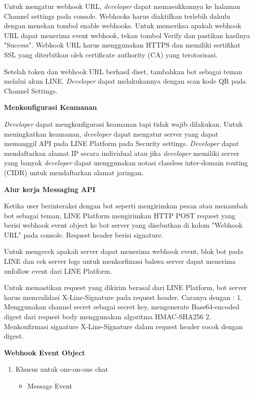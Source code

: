 \documentclass[a4paper,twoside]{article}
\begin{document}
\begin{enumerate}
\begin{enumerate}
Untuk mengatur webhook URL, \textit{developer} dapat memasukkannya ke halaman Channel settings pada console. Webhooks harus diaktifkan terlebih dahulu dengan menekan tombol enable webhooks. Untuk memeriksa apakah webhook URL dapat menerima event webhook, tekan tombol Verify dan pastikan hasilnya "Success". Webhook URL harus menggunakan HTTPS dan memiliki sertifikat SSL yang diterbitkan oleh certificate authority (CA) yang terotorisasi.

Setelah token dan webhook URL berhasil diset, tambahkan bot sebagai teman melalui akun LINE. \textit{Developer} dapat melakukannya dengan scan kode QR pada Channel Settings.

\textbf{Menkonfigurasi Keamanan}

\textit{Developer} dapat mengkonfigurasi keamanan tapi tidak wajib dilakukan. Untuk meningkatkan keamanan, \textit{developer} dapat mengatur server yang dapat memanggil API pada LINE Platform pada Security settings. \textit{Developer} dapat mendaftarkan alamat IP secara individual atau jika \textit{developer} memiliki server yang banyak \textit{developer} dapat menggunakan notasi classless inter-domain routing (CIDR) untuk mendaftarkan alamat jaringan.

\textbf{Alur kerja Messaging API}

Ketika user berinteraksi dengan bot seperti mengirimkan pesan atau menambah bot sebagai teman, LINE Platform mengirimkan HTTP POST request yang berisi webhook event object ke bot server yang disebutkan di kolom "Webhook URL" pada console. Request header berisi signature. 

Untuk mengecek apakah server dapat menerima webhook event, blok bot pada LINE dan cek server logs untuk menkorfimasi bahwa server dapat menerima unfollow event dari LINE Platform.

Untuk memastikan request yang dikirim berasal dari LINE Platform, bot server harus memvalidasi X-Line-Signature pada request header. Caranya dengan :
1. Menggunakan channel secret sebagai secret key, mengenerate Base64-encoded digest dari request body menggunakan algoritma HMAC-SHA256
2. Menkonfirmasi signature X-Line-Signature dalam request header cocok dengan digest.
 

\textbf{Webhook Event Object}

\begin{enumerate}
\item Khusus untuk one-on-one chat

\begin{itemize}
\item Message Event


\end{itemize}
\end{enumerate}
\end{enumerate}
\end{enumerate}
\end{document}
